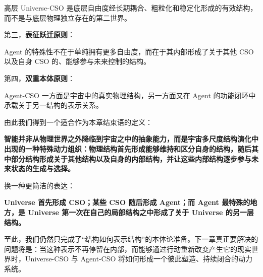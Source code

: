 \begin{statementbox}
高层 Universe-CSO 是底层自由度经长期耦合、粗粒化和稳定化形成的有效结构，而不是与底层物理独立存在的第二世界。
\end{statementbox}

第三，\textbf{表征跃迁原则}：

\begin{statementbox}
Agent 的特殊性不在于单纯拥有更多自由度，而在于其内部形成了关于其他 CSO 以及自身 CSO 的、能够参与未来控制的结构。
\end{statementbox}

第四，\textbf{双重本体原则}：

\begin{statementbox}
Agent-CSO 一方面是宇宙中的真实物理结构，另一方面又在 Agent 的功能闭环中承载关于另一结构的表示关系。
\end{statementbox}

由此我们得到一个适合作为本章结束语的定义：

\begin{definition*}
\bfseries
智能并非从物理世界之外降临到宇宙之中的抽象能力，而是宇宙多尺度结构演化中出现的一种特殊动力组织：物理结构首先形成能够维持和区分自身的结构，随后其中部分结构形成关于其他结构以及自身的内部结构，并让这些内部结构逐步参与未来状态的生成与选择。
\end{definition*}

换一种更简洁的表达：

\begin{statementbox}
\bfseries
Universe 首先形成 CSO；某些 CSO 随后形成 Agent；而 Agent 最特殊的地方，是 Universe 第一次在自己的局部结构之中形成了关于 Universe 的另一层结构。
\end{statementbox}

至此，我们仍然只完成了“结构如何表示结构”的本体论准备。下一章真正要解决的问题将是：当这种表示不再停留在内部，而能够通过行动重新改变产生它的现实世界时，Universe-CSO 与 Agent-CSO 将如何形成一个彼此塑造、持续闭合的动力系统。
